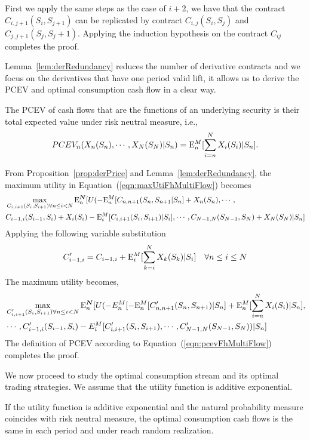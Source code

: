  First we apply the same steps as the case of $i+2$, we have that the contract $C_{i,j+1}(S_i,S_{j+1})$ can be replicated by contract $C_{i,j}(S_i,S_j)$ and $C_{j,j+1}(S_j,S_j+1)$. Applying the induction hypothesis on the contract $C_{ij}$ completes the proof. 
\endproof

Lemma~\ref{lem:derRedundancy} reduces the number of derivative contracts and we focus on the derivatives that have one period valid lift, it allows us to derive the PCEV and optimal consumption cash flow in a clear way.

{\theorem \label{the:pcevFh} 
The PCEV of cash flows that are the functions of an underlying security is their total expected value under risk neutral measure, i.e.,
\begin{align}
PCEV_n(X_n(S_n), \cdots, X_N(S_N)|S_n) =  \mathrm{E}_n^M[\sum_{i=n}^N X_i(S_i) |S_n].
\end{align}
}

\proof
From Proposition~\ref{prop:derPrice} and Lemma~\ref{lem:derRedundancy}, the maximum utility in Equation~(\ref{eqn:maxUtiFhMultiFlow}) becomes
\begin{align*}
 & \max_{C_{i,i+1}(S_i,S_{i+1}) \forall n \leq i < N} \mathrm{E}_n^{\bm{N}} [U ( -\mathrm{E}_n^M[C_{n,n+1}(S_n,S_{n+1}|S_n] + X_n(S_n),\cdots, \\ 
 & C_{i-1, i}(S_{i-1},S_i) + X_i(S_i) - \mathrm{E}_{i}^M[C_{i,i+1}(S_i,S_{i+1})|S_i], \cdots, C_{N-1,N}(S_{N-1},S_N) + X_N(S_N)|S_n]
\end{align*}
Applying the following variable substitution
\[ C'_{i-1,i} = C_{i-1,i} + \mathrm{E}_{i}^M[ \sum_{k=i}^N X_k(S_k) |S_i] \quad \forall n\leq i \leq N \]
The maximum utility becomes,
\begin{align*}
&\max_{C'_{i,i+1}(S_i,S_{i+1}) \forall n \leq i < N} \mathrm{E}_n^{\bm{N}} [ U(-E_n^M[-\mathrm{E}_n^M [C'_{n,n+1}(S_n,S_{n+1}) |S_n] + \mathrm{E}_n^M[\sum_{i=n}^N X_i(S_i) |S_n], \\
&\cdots, C'_{i-1,i}(S_{i-1},S_i) - E_i^M[C'_{i,i+1}(S_i,S_{i+1}), \cdots, C'_{N-1,N} (S_{N-1},S_N) ) |S_n]
\end{align*}
The definition of PCEV according to Equation~(\ref{eqn:pcevFhMultiFlow}) completes the proof.
\endproof


We now proceed to study the optimal consumption stream and its optimal trading strategies.  We assume that the utility function is additive exponential. 

{\lemma If the utility function is additive exponential and the natural probability measure coincides with risk neutral measure, the optimal consumption cash flows is the same in each period and under reach random realization. 
}

